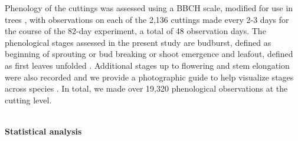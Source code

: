 \documentclass[11pt]{article}
\begin{document}
Phenology of the cuttings was assessed using a BBCH scale, modified for use in trees \citep{Finn:2007}, with observations on each of the 2,136 cuttings made every 2-3 days for the course of the 82-day experiment, a total of 48 observation days. The phenological stages assessed in the present study are budburst, defined as beginning of sprouting or bud breaking or shoot emergence \citep[Code 07 in][]{Finn:2007} and leafout, defined as first leaves unfolded \citep[Code 11 in][]{Finn:2007}. Additional stages up to flowering and stem elongation were also recorded and we provide a photographic guide to help visualize stages across species \citep{bbchguide}. In total, we made over 19,320 phenological observations at the cutting level.
%

\vspace{1ex}\\
\noindent \textbf{Statistical analysis}
\end{document}
